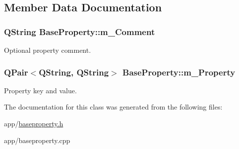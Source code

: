 \subsection{Member Data Documentation}
\hypertarget{class_base_property_a2a08935cf352cb274575be32188e8acd}{
\subsubsection[{m\-\_\-\-Comment}]{\setlength{\rightskip}{0pt plus 5cm}Q\-String Base\-Property\-::m\-\_\-\-Comment\hspace{0.3cm}{\ttfamily [protected]}}}\label{class_base_property_a2a08935cf352cb274575be32188e8acd}
Optional property comment. \hypertarget{class_base_property_a2338fecdc198936259809444e93e93df}{
\subsubsection[{m\-\_\-\-Property}]{\setlength{\rightskip}{0pt plus 5cm}Q\-Pair$<$Q\-String, Q\-String$>$ Base\-Property\-::m\-\_\-\-Property\hspace{0.3cm}{\ttfamily [protected]}}}\label{class_base_property_a2338fecdc198936259809444e93e93df}
Property key and value. 

The documentation for this class was generated from the following files\-:\begin{DoxyCompactItemize}
\item 
app/\hyperlink{baseproperty_8h}{baseproperty.\-h}\item 
app/baseproperty.\-cpp\end{DoxyCompactItemize}
